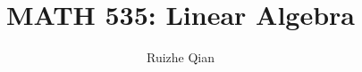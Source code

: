 \documentclass[12pt]{amsart}
\title{MATH 535: Linear Algebra}
\author{Ruizhe Qian}
\date{}
\theoremstyle{plain}
\theoremstyle{remark}
\begin{document}
\onehalfspacing
\maketitle

\tableofcontents




















\end{document}
